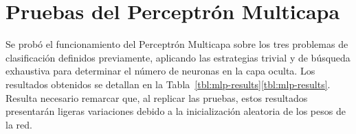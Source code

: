 %
%
%
\section{Pruebas del Perceptrón Multicapa}
%
Se probó el funcionamiento del Perceptrón Multicapa sobre los tres
problemas de clasificación definidos previamente, aplicando las
estrategias trivial y de búsqueda exhaustiva para determinar el número
de neuronas en la capa oculta.
Los resultados obtenidos se detallan en la
\iflatexml{}Tabla~\ref{tbl:mlp-results}\else\autoref{tbl:mlp-results}\fi.
Resulta necesario remarcar que, al replicar las pruebas, estos
resultados presentarán ligeras variaciones debido a la inicialización
aleatoria de los pesos de la red.

